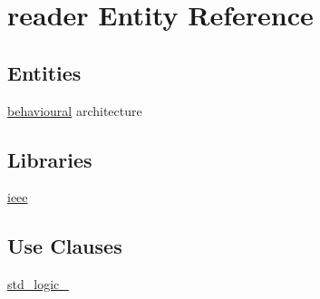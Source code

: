 \hypertarget{classreader}{}\section{reader Entity Reference}
\label{classreader}
\subsection*{Entities}
\begin{DoxyCompactItemize}
\item 
\hyperlink{classreader_1_1behavioural}{behavioural} architecture
\end{DoxyCompactItemize}
\subsection*{Libraries}
 \begin{DoxyCompactItemize}
\item 
\mbox{\label{classreader_a0a6af6eef40212dbaf130d57ce711256}} 
\hyperlink{classreader_a0a6af6eef40212dbaf130d57ce711256}{ieee} 
\end{DoxyCompactItemize}
\subsection*{Use Clauses}
 \begin{DoxyCompactItemize}
\item 
\mbox{\label{classreader_acd03516902501cd1c7296a98e22c6fcb}} 
\hyperlink{classreader_acd03516902501cd1c7296a98e22c6fcb}{std\+\_\+logic\+\_}   
\end{DoxyCompactItemize}
